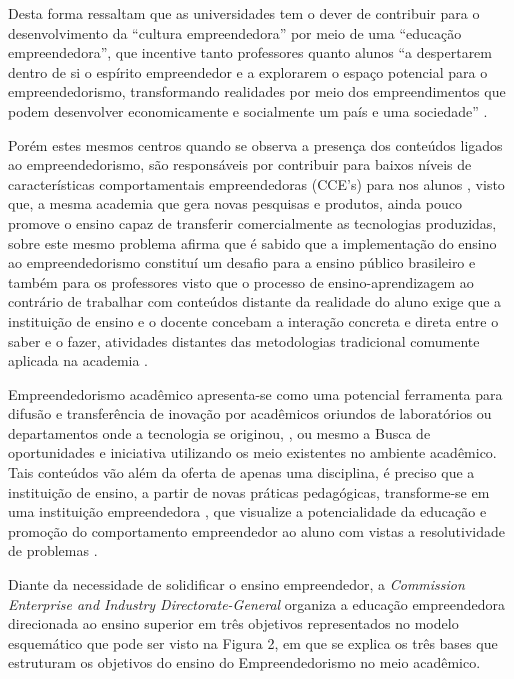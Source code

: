 Desta forma  ressaltam que as universidades tem o dever de contribuir para o desenvolvimento da “cultura empreendedora” por meio de uma “educação empreendedora”, que incentive tanto professores quanto alunos “a despertarem dentro de si o espírito empreendedor e a explorarem o espaço potencial para o empreendedorismo, transformando realidades por meio dos empreendimentos que podem desenvolver economicamente e socialmente um país e uma sociedade” \cite{tscha_empreendendo_2014}. 

Porém estes mesmos centros quando se observa a presença dos conteúdos ligados ao empreendedorismo, são responsáveis por contribuir para baixos níveis de características comportamentais empreendedoras (CCE’s) para nos alunos \cite{minello_caracteristicas_2017}, visto que, a mesma academia que gera novas pesquisas e produtos, ainda pouco promove o ensino capaz de transferir comercialmente as  tecnologias produzidas, sobre este mesmo problema  afirma que é sabido que a implementação do ensino ao empreendedorismo constituí um desafio para a ensino público brasileiro e também para os professores visto que o processo de ensino-aprendizagem ao contrário de trabalhar com conteúdos distante da realidade do aluno exige que a instituição de ensino e o docente concebam a interação concreta e direta entre o saber e o fazer, atividades distantes das metodologias tradicional comumente aplicada na academia \cite{saviani_historia_2019}. 


Empreendedorismo acadêmico apresenta-se como uma potencial ferramenta para difusão e transferência de inovação por acadêmicos oriundos de laboratórios ou departamentos onde a tecnologia se originou, \cite{guo_what_2019, abreu_nature_2013}, ou mesmo a Busca de oportunidades e iniciativa utilizando os meio existentes no ambiente acadêmico. Tais conteúdos vão além da oferta de apenas uma disciplina, é preciso que a instituição de ensino, a partir de novas práticas pedagógicas, transforme-se em uma instituição empreendedora \cite{campelli_empreendedorismo_2011}, que visualize a potencialidade da educação e promoção do comportamento empreendedor ao aluno com vistas a resolutividade de problemas \cite{degen_o_1989}.

Diante da necessidade de solidificar o ensino empreendedor, a \textit{ Commission Enterprise and Industry Directorate-General} \cite{european_commission_best_2008} organiza a educação empreendedora direcionada ao ensino superior em três objetivos representados no modelo esquemático que pode ser visto na Figura 2, em que se explica os três bases que estruturam os objetivos do ensino do Empreendedorismo no meio acadêmico. 

